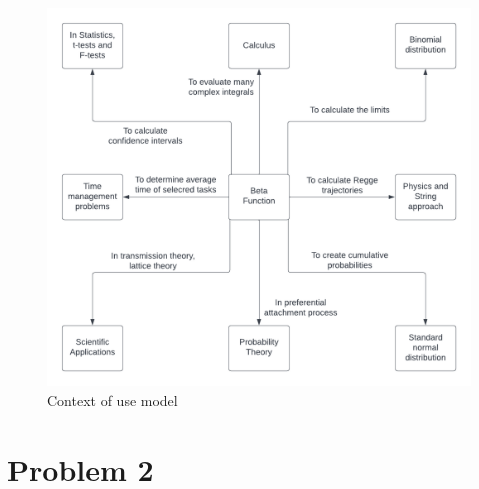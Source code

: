 \documentclass[12pt,a4paper]{report}
\begin{document}
\begin{figure}[h]
    \centering
    \begin{center}
    \includegraphics[width=1.0\linewidth]{Images/beta_contextmodel.png}    
    \end{center}
    \caption{Context of use model}
    \label{fig:Context of Use Model.}
\end{figure}



\chapter{Problem 2}
\end{document}
